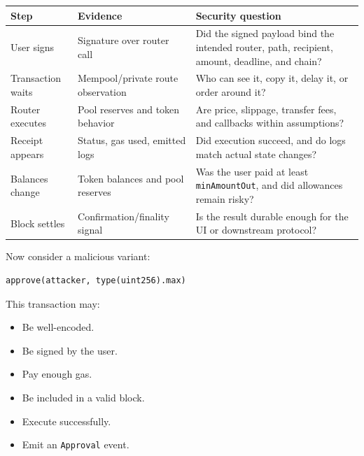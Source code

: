 {\def\LTcaptype{none} %
\begin{longtable}[]{@{}
  >{\raggedright\arraybackslash}p{}
  >{\raggedright\arraybackslash}p{}
  >{\raggedright\arraybackslash}p{}@{}}
\toprule\noalign{}
\begin{minipage}[b]{\linewidth}\raggedright
Step
\end{minipage} & \begin{minipage}[b]{\linewidth}\raggedright
Evidence
\end{minipage} & \begin{minipage}[b]{\linewidth}\raggedright
Security question
\end{minipage} \\
\midrule\noalign{}
\endhead
\bottomrule\noalign{}
\endlastfoot
User signs & Signature over router call & Did the signed payload bind
the intended router, path, recipient, amount, deadline, and chain? \\
Transaction waits & Mempool/private route observation & Who can see it,
copy it, delay it, or order around it? \\
Router executes & Pool reserves and token behavior & Are price,
slippage, transfer fees, and callbacks within assumptions? \\
Receipt appears & Status, gas used, emitted logs & Did execution
succeed, and do logs match actual state changes? \\
Balances change & Token balances and pool reserves & Was the user paid
at least \passthrough{\lstinline!minAmountOut!}, and did allowances
remain risky? \\
Block settles & Confirmation/finality signal & Is the result durable
enough for the UI or downstream protocol? \\
\end{longtable}
}

Now consider a malicious variant:

\begin{lstlisting}
approve(attacker, type(uint256).max)
\end{lstlisting}

This transaction may:

\begin{itemize}
\tightlist
\item
  Be well-encoded.
\item
  Be signed by the user.
\item
  Pay enough gas.
\item
  Be included in a valid block.
\item
  Execute successfully.
\item
  Emit an \passthrough{\lstinline!Approval!} event.
\end{itemize}

